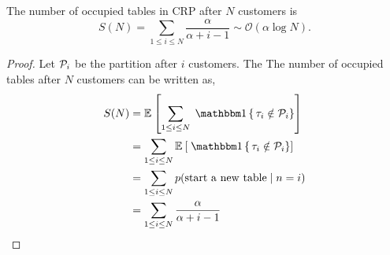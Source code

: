\begin{property}
	The number of occupied tables in CRP after $N$ customers is
	\begin{equation}
		S(N) = \sum_{1 \leq i \leq N} \frac{\alpha}{\alpha + i - 1} \sim \mathcal{O}(\alpha\log N).
	\end{equation}
\end{property}
\begin{proof}
Let $\mathcal{P}_i$ be the partition after $i$ customers.
The The number of occupied tables after $N$ customers can be written as, 
\begin{align}
	S(N) & = \E{}{\sum_{1 \leq i \leq N} \Ind{\tau_i \notin \cP_i} } \\
	& = \sum_{1 \leq i \leq N} \E{}{\Ind{\tau_i \notin \cP_i}} \\
	& = \sum_{1 \leq i \leq N} p(\mathrm{start\ a\ new\ table} \mid n = i) \\
	& = \sum_{1 \leq i \leq N} \frac{\alpha}{\alpha + i - 1}
\end{align}
\end{proof}

